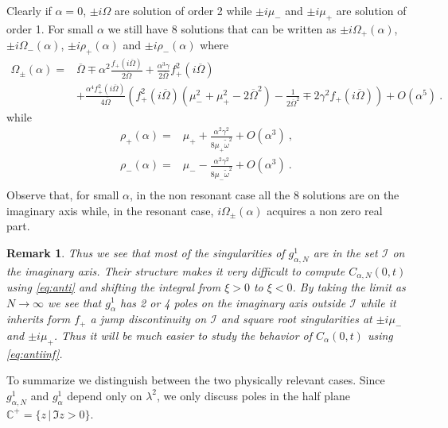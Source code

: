 \documentclass[11pt]{article}
\numberwithin{equation}{section}
\newtheorem{rmk}[theorem]{Remark}
\numberwithin{theorem}{section}
\def\tilde#1{\widetilde{#1}}
\begin{document}
Clearly if $\alpha=0$, $\pm i\Omega$ are solution of order 2 while $\pm i\mu_-$ and $\pm i\mu_+$ are solution of order
1. For small $\alpha$ we still have 8 solutions that can be written as $\pm i \Omega_+(\alpha)$, $\pm i
\Omega_-(\alpha)$, $\pm i \rho_+(\alpha)$ and $\pm i \rho_-(\alpha)$ where
\begin{equation}\label{eq:polone}
  \begin{split}
\Omega_\pm(\alpha)=&\overline \Omega\mp\alpha^2
\frac{f_+(i\overline\Omega)}{2\overline\Omega}+\frac{\alpha^3\gamma}{2\overline
  \Omega}f^2_+(i\overline \Omega)
\\
&+\frac{\alpha^4f_+^2(i\overline\Omega)}{4\overline
  \Omega}\left(f_+^2(i\overline \Omega)
(\mu_-^2+\mu_+^2-2\overline \Omega^2)-\frac{1}{2\overline \Omega^2}
\mp 2\gamma^2 f_+(i\overline\Omega)\right) +O(\alpha^5)\ .
\end{split}\end{equation}
while
\begin{equation}\label{eq:poletto}
\begin{aligned}
\rho_+(\alpha)=&\mu_++\frac{\alpha^2\gamma^2}{8\mu_+\tilde\omega^2}
+ O(\alpha^3)\ ,\\
\rho_-(\alpha)=&\mu_--\frac{\alpha^2\gamma^2}{8\mu_-\tilde\omega^2}+O(\alpha
^3)\ .\\
\end{aligned}
\end{equation}
Observe that, for small $\alpha$, in the non resonant case all the 8 solutions are on the imaginary axis while, in the
resonant case, $i\Omega_\pm(\alpha)$ acquires a non zero real part.

\begin{rmk}\label{rmk:shift}\emph{
Thus we see that most of the singularities of $g^1_{\alpha,N}$ are in the set $\mathcal I$ on the imaginary axis. Their
structure makes it very difficult to compute $C_{\alpha,N}(0,t)$ using \eqref{eq:anti} and shifting the integral from
$\xi>0$ to $\xi<0$. By taking the limit as $N\to\infty$ we see that $g^1_\alpha$ has 2 or 4 poles on the imaginary axis
outside $\mathcal I$ while it inherits form $f_+$ a jump discontinuity on $\mathcal I$ and square root singularities at
$\pm i\mu_-$ and $\pm i\mu_+$. Thus it will be much easier to study the behavior of $C_{\alpha}(0,t)$ using
\eqref{eq:antiinf}.}
\end{rmk}

To summarize we distinguish between the two physically relevant cases. Since $g^1_{\alpha,N}$ and $g^1_\alpha$ depend
only on $\lambda^2$, we only discuss poles in the half plane $\mathds C^+=\{z\, |\, \Im z>0\}$.
\end{document}
